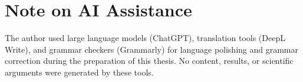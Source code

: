 \documentclass[
	english,
	ruledheaders=section,
	class=report,
	thesis={type=master},
	accentcolor=9c,
	custommargins=true,
	marginpar=false,
	parskip=half-,
	fontsize=11pt,
	pdfa=true,
]{tudapub}
\begin{document}
\newpage

\section*{Note on AI Assistance}

The author used large language models (ChatGPT), translation tools (DeepL Write), and grammar checkers (Grammarly) for language polishing and grammar correction during the preparation of this thesis. No content, results, or scientific arguments were generated by these tools.

\printbibliography[title={References}]
\end{document}
